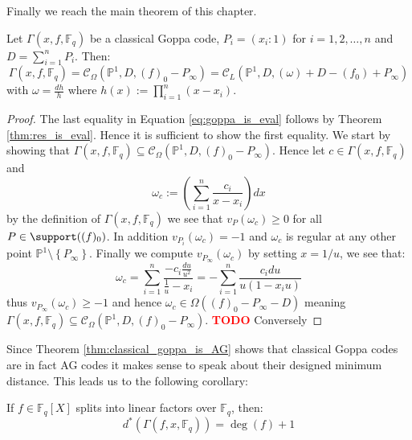Finally we reach the main theorem of this chapter.

\begin{theorem}\label{thm:classical_goppa_is_AG}
  Let $\Gamma(x, f, \mathbb{F}_q)$ be a classical Goppa code, $P_i = (x_i : 1)$ for $i = 1, 2, \ldots, n$ and $D = \sum_{i = 1}^n P_i$. Then:
  \begin{equation}\label{eq:goppa_is_eval}
    \Gamma(x, f, \mathbb{F}_q) = \mathcal{C}_{\Omega}(\mathbb{P}^1, D, (f)_{0} - P_{\infty}) = \mathcal{C}_L(\mathbb{P}^1, D, (\omega) + D - (f_0) + P_{\infty})
  \end{equation}
  with $\omega = \frac{dh}{h}$ where $h(x) := \prod^n_{i = 1} (x - x_{i})$.
\end{theorem}
\begin{proof}
  The last equality in Equation \eqref{eq:goppa_is_eval} follows by Theorem \ref{thm:res_is_eval}. Hence it is sufficient to show the first equality. We start by showing that $\Gamma(x, f, \mathbb{F}_q) \subseteq \mathcal{C}_{\Omega}(\mathbb{P}^1, D, (f)_0 - P_{\infty})$. Hence let $c \in \Gamma(x, f, \mathbb{F}_q)$ and
  \begin{equation*}
    \omega_c := \left(\sum_{i=1}^n \frac{c_{i}}{x - x_{i}} \right) dx
  \end{equation*}
  by the definition of $\Gamma(x, f, \mathbb{F}_q)$ we see that $v_{P}(\omega_c) \geq 0$ for all $P \in \support((f)_{0})$. In addition $v_{P_i}(\omega_c) = -1$ and $\omega_c$ is regular at any other point $\mathbb{P}^1 \setminus \left\{P_\infty\right\}$. Finally we compute $v_{P_\infty}(\omega_c)$ by setting $x = 1/u$, we see that:
  \begin{equation*}
    \omega_c = \sum_{i=1}^n  \frac{-c_{i} \frac{du}{u^{2}}}{\frac{1}{u} - x_i} = - \sum^n_{i = 1} \frac{c_{i} du}{u(1 - x_{i}u)}
  \end{equation*}
  thus $v_{P_\infty}(\omega_{c}) \geq -1$ and hence $\omega_c \in \Omega((f)_0 - P_{\infty} - D)$ meaning $\Gamma(x, f, \mathbb{F}_q) \subseteq \mathcal{C}_{\Omega}(\mathbb{P}^1, D, (f)_0 - P_{\infty})$.
  \textcolor{red}{\textbf{TODO}} Conversely
\end{proof}
Since Theorem \ref{thm:classical_goppa_is_AG} shows that classical Goppa codes are in fact AG codes it makes sense to speak about their designed minimum distance. This leads us to the following corollary:
\begin{corollary}\label{cor:f_splitting_yields_design_distance}
  If $f \in \mathbb{F}_q[X]$ splits into linear factors over $\mathbb{F}_q$, then:
\begin{equation*}
  d^{*}\left(\Gamma(f, x, \mathbb{F}_q)\right) = \deg(f) + 1
\end{equation*}
\end{corollary}
